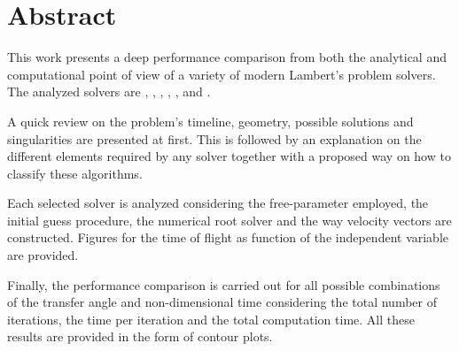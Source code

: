 \chapter*{Abstract}

This work presents a deep performance comparison from both the analytical and
computational point of view of a variety of modern Lambert's problem solvers.
The analyzed solvers are \cite{gauss1809}, \cite{battin1984},
\cite{gooding1990}, \cite{avanzini2008}, \cite{arora2013}, \cite{vallado2013}
and \cite{izzo2015}.

A quick review on the problem's timeline, geometry, possible solutions and
singularities are presented at first. This is followed by an explanation on the
different elements required by any solver together with a proposed way on how to
classify these algorithms.

Each selected solver is analyzed considering the free-parameter employed, the
initial guess procedure, the numerical root solver and the way velocity vectors
are constructed. Figures for the time of flight as function of the independent
variable are provided.

Finally, the performance comparison is carried out for all possible combinations
of the transfer angle and non-dimensional time considering the total number of
iterations, the time per iteration and the total computation time. All these
results are provided in the form of contour plots. 
